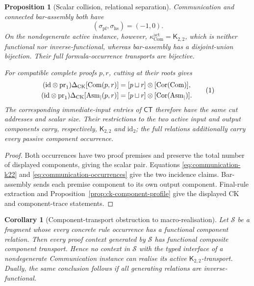 \documentclass[10pt,a4paper]{article}
\theoremstyle{plain}
\newtheorem{proposition}[theorem]{Proposition}
\newtheorem{corollary}[theorem]{Corollary}
\theoremstyle{definition}
\theoremstyle{remark}
\newcommand{\DeltaCK}{\Delta_{\mathrm{CK}}}
\newcommand{\fjoin}{\mathbin{\sqcup}}
\newcommand{\eqtag}{\refstepcounter{equation}\tag{\theequation}}
\begin{document}
\begin{proposition}[Scalar collision, relational separation]
\label{prop:communication-footprint}
Communication and connected bar-assembly both have
\[
       (\sigma_{\mathrm{pf}},\sigma_{\mathrm{hs}})=(-1,0).
\]
On the nondegenerate active instance, however,
\(\kappa_{\mathrm{Com}}^{\mathrm{act}}=\mathsf K_{2,2}\), which is neither
functional nor inverse-functional, whereas bar-assembly has a
disjoint-union bijection.  Their full formula-occurrence transports are
bijective.

For compatible complete proofs \(p,r\), cutting at their roots gives
\[
\begin{aligned}
 (\mathrm{id}\otimes\operatorname{pr}_1)\DeltaCK[\mathrm{Com}(p,r)]
   &=[p\fjoin r]\otimes[\operatorname{Cor}(\mathrm{Com})],\\
 (\mathrm{id}\otimes\operatorname{pr}_1)\DeltaCK[\mathrm{Asm}_{\mid}(p,r)]
   &=[p\fjoin r]\otimes[\operatorname{Cor}(\mathrm{Asm}_{\mid})].
\end{aligned}
\eqtag\label{eq:communication-assembly-extraction}
\]
The corresponding immediate-input entries of \(\mathsf{CT}\) therefore
have the same cut addresses and scalar size.  Their restrictions to the
two active input and output components carry, respectively,
\(\mathsf K_{2,2}\) and \(\mathrm{id}_2\); the full relations additionally
carry every passive component occurrence.
\end{proposition}

\begin{proof}
Both occurrences have two proof premises and preserve the total number of
displayed components, giving the scalar pair.  Equations
\eqref{eq:communication-k22} and
\eqref{eq:communication-occurrences} give the two incidence claims.
Bar-assembly sends each premise component to its own output component.
Final-rule extraction and Proposition~\ref{prop:ck-component-profile} give
the displayed CK and component-trace statements.
\end{proof}

\begin{corollary}[Component-transport obstruction to macro-realisation]
\label{cor:communication-macro-obstruction}
Let \(\mathcal S\) be a fragment whose every concrete rule occurrence has
a functional component relation.  Then every proof context generated by
\(\mathcal S\) has functional composite component transport.  Hence no
context in \(\mathcal S\) with the typed interface of a nondegenerate
Communication instance can realise its active
\(\mathsf K_{2,2}\)-transport.  Dually, the same conclusion follows if
all generating relations are inverse-functional.
\end{corollary}
\end{document}
